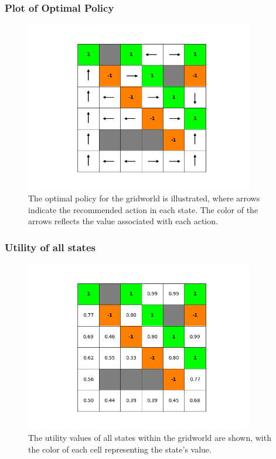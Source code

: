 \documentclass{article}
\begin{document}
\subsubsection{Plot of Optimal Policy}

\begin{figure}[H]
    \includegraphics[width=100mm]{../asset/value_iteration_policy.png}
    \caption{The optimal policy for the gridworld is illustrated, where arrows indicate the recommended action in each state. The color of the arrows reflects the value associated with each action.}
    \label{fig:value_iteration_policy}
\end{figure}

\subsubsection{Utility of all states}

\begin{figure}[H]
    \includegraphics[width=100mm]{../asset/value_iteration_utility.png}
    \caption{The utility values of all states within the gridworld are shown, with the color of each cell representing the state's value.}
    \label{fig:value_iteration_utility}
\end{figure}
\end{document}
